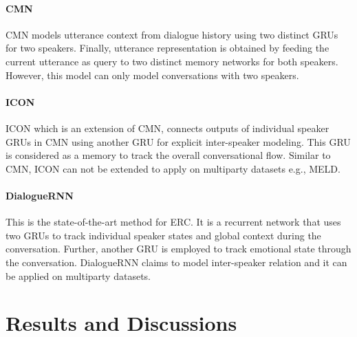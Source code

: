 \documentclass[11pt,a4paper]{article}
\begin{document}
\paragraph{CMN~\cite{hazarika-EtAl:2018:N18-1}}

CMN models utterance context from dialogue history
using two distinct GRUs for two speakers. 
Finally, utterance representation is obtained by feeding the current utterance as query to two distinct memory networks for both speakers. However, this model can only model conversations with two speakers. 

\paragraph{ICON~\cite{hazarika-EtAl:2018:N18-1}}
ICON which is an extension of CMN, connects outputs of individual speaker GRUs in CMN using another GRU for explicit inter-speaker modeling. This GRU is considered as a memory to track the overall conversational flow. Similar to CMN, ICON can not be extended to apply on multiparty datasets e.g., MELD.
\paragraph{DialogueRNN~\cite{dialoguernn}}

This is the state-of-the-art method for ERC. It is a recurrent network that uses two GRUs to track individual speaker states and global context during the conversation. Further, another GRU is employed to track emotional state through the conversation. DialogueRNN claims to model inter-speaker relation and it can be applied on multiparty datasets.

\section{Results and Discussions}
\label{sec:results}
\end{document}
